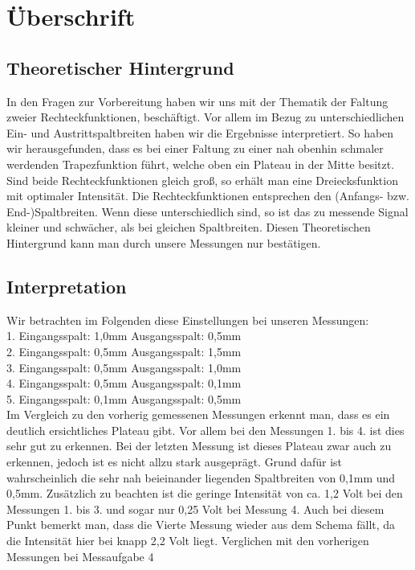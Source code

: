 
\section{Überschrift}
\subsection {Theoretischer Hintergrund}
In den Fragen zur Vorbereitung haben wir uns mit der Thematik der Faltung zweier Rechteckfunktionen, besch\"aftigt. Vor allem im Bezug zu unterschiedlichen Ein- und Austrittspaltbreiten haben wir die Ergebnisse interpretiert. So haben wir herausgefunden, dass es bei einer Faltung zu einer nah obenhin schmaler werdenden Trapezfunktion f\"uhrt, welche oben ein Plateau in der Mitte besitzt. Sind beide Rechteckfunktionen gleich gro\ss{}, so erh\"alt man eine Dreiecksfunktion mit optimaler Intensit\"at. Die Rechteckfunktionen entsprechen den (Anfangs- bzw. End-)Spaltbreiten. Wenn diese unterschiedlich sind, so ist das zu messende Signal kleiner und schw\"acher, als bei gleichen Spaltbreiten. Diesen Theoretischen Hintergrund kann man  durch unsere Messungen nur best\"atigen. 

\subsection {Interpretation} 

Wir betrachten im Folgenden diese Einstellungen bei unseren Messungen:\\
1. Eingangsspalt: 1,0mm \tab Ausgangsspalt: 0,5mm\\
2. Eingangsspalt: 0,5mm \tab Ausgangsspalt: 1,5mm\\
3. Eingangsspalt: 0,5mm \tab Ausgangsspalt: 1,0mm\\
4. Eingangsspalt: 0,5mm \tab Ausgangsspalt: 0,1mm\\
5. Eingangsspalt: 0,1mm \tab Ausgangsspalt: 0,5mm\\


Im Vergleich zu den vorherig gemessenen Messungen erkennt man, dass es ein deutlich ersichtliches Plateau gibt. Vor allem bei den Messungen 1. bis 4. ist dies sehr gut zu erkennen. Bei der letzten Messung ist dieses Plateau zwar auch zu erkennen, jedoch ist es nicht allzu stark ausgepr\"agt. Grund daf\"ur ist wahrscheinlich die sehr nah beieinander liegenden Spaltbreiten von 0,1mm und 0,5mm. 
Zus\"atzlich zu beachten ist die geringe Intensit\"at von ca. 1,2 Volt bei den Messungen 1. bis 3. und sogar nur 0,25 Volt bei Messung 4.  
Auch bei diesem Punkt bemerkt man, dass die Vierte Messung wieder aus dem Schema f\"allt, da die Intensit\"at hier bei knapp 2,2 Volt liegt. Verglichen mit den vorherigen Messungen bei Messaufgabe 4